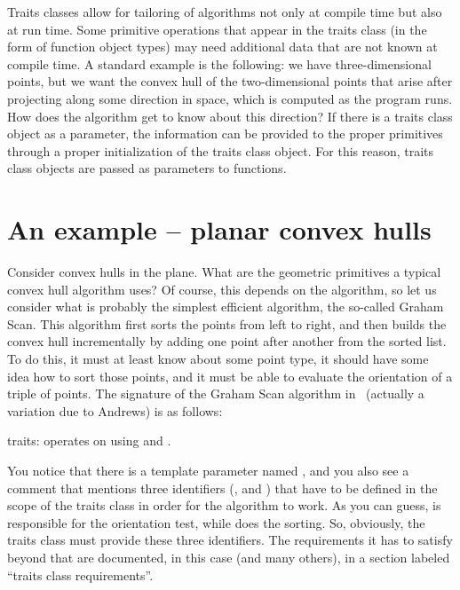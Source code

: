 Traits classes allow for tailoring of algorithms not only at compile time
but also at run time.  Some primitive operations that appear in the traits
class (in the form of function object types) may need additional data that
are not known at compile time.  A standard example is the following: we have
three-dimensional points, but we want the convex hull of the two-dimensional 
points that arise after projecting along some direction in space, which is
computed as the program runs. How does the algorithm get to know about this 
direction? If there is a traits class object as a parameter, the 
information can be provided to the proper primitives through a proper 
initialization of the traits class object.
For this reason, traits class objects are passed
as parameters to functions. 

\section{An example -- planar convex hulls}
\label{sec:traits_class_example}

Consider convex hulls in the plane. What are the geometric primitives a 
typical 
convex hull algorithm uses? Of course, this depends on the algorithm, so
let us consider what is probably the simplest efficient algorithm, the 
so-called Graham Scan. This algorithm first sorts the points from left to right,
and then builds the convex hull incrementally by adding one point after
another from the sorted list. To do this, it must at least know about 
some point type, it should have some idea how to sort those points, and
it must be able to evaluate the orientation of a triple of points. The
signature of the Graham Scan algorithm in \cgal\ (actually a variation 
due to Andrews) is as follows:

\ccAutoIndexingOff
{}
           {{\sc traits}: operates on  using
             and .
           }
\ccAutoIndexingOn

You notice that there is a template parameter named , and you
also see a comment that mentions three identifiers (, 
 and ) that have to be defined in the
scope of the traits class in order for the algorithm to work.
As you can guess,  is responsible for the orientation 
test, while  does the sorting. So, obviously, the traits class
must provide these three identifiers. The requirements it has to satisfy
beyond that are documented, in this case (and many others), in a section
labeled ``traits class requirements''. 

